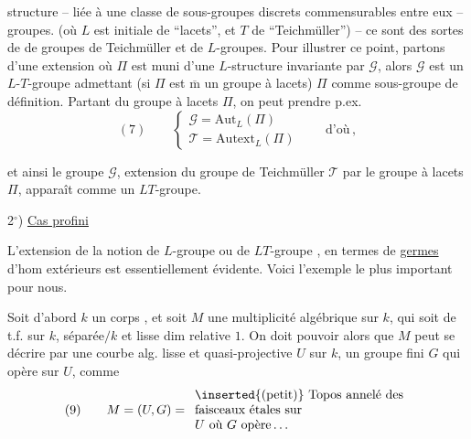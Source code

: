
structure -- liée à une classe de sous-groupes discrets commensurables entre eux --  groupes. (où $L$ est initiale de ``lacets'', et $T$ de ``Teichmüller'') -- ce sont des sortes de  de groupes de Teichmüller et de $L$-groupes. Pour illustrer ce point, partons d'une extension
où $\Pi$ est muni d'une $L$-structure invariante par $\mathcal{G}$, alors $\mathcal{G}$ est un $L$-$T$-groupe admettant (si $\Pi$ est $\overline{\mathrm m}$ un groupe à lacets) $\Pi$ comme sous-groupe de définition. Partant du groupe à lacets $\Pi$, on peut prendre p.ex.
\[
(7)\qquad
\left\{
\begin{array}{l}
\mathcal{G}=\mathrm{Aut}_{L}(\Pi)\\
\mathcal{T}=\mathrm{Autext}_{L}(\Pi)
\end{array}
\right.
\qquad\text{d'où}
\,,
\]


et ainsi le groupe  $\mathcal{G}$, extension du groupe de Teichmüller $\mathcal{T}$ par le groupe à lacets $\Pi$, apparaît comme un $LT$-groupe.



2$^\circ$) \uline{Cas profini}

L'extension de la notion de $L$-groupe ou de $LT$-groupe \inserted{$\Pi$}, en termes de \uline{germes} d'hom extérieurs
est essentiellement évidente. Voici l'exemple le plus important pour nous. 

Soit d'abord $k$ un corps , et soit $M$ une   multiplicité algébrique sur $k$, qui soit  de t.f. sur $k$,  séparée$/k$ et lisse  dim relative $1$. On doit pouvoir  alors que $M$ peut se décrire par une courbe alg. lisse et quasi-projective $U$ sur $k$, un groupe fini  $G$ qui opère sur $U$,  comme
\[
(9)\qquad M=(U,G)=
\begin{array}{l}
\inserted{\text{(petit)}}\text{ Topos annelé des}\\
\text{faisceaux étales sur}\\
U\text{ où }G\text{ opère}\ldots
\end{array}
\]

